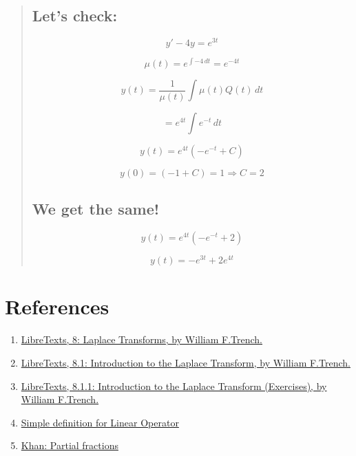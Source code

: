 \documentclass[
  letterpaper,
  DIV=11,
  numbers=noendperiod]{scrreprt}
\theoremstyle{plain}
\theoremstyle{remark}
\begin{document}
\begin{tcolorbox}
\begin{quote}
\subsection*{Let's check:}\label{lets-check}

\[y'-4y=e^{3t}\]

\[\mu(t)=e^{\int -4\,dt}=e^{-4t}\]

\[y(t)=\frac{1}{\mu(t)}\int \mu(t)Q(t)\,dt\]

\[=e^{4t}\int e^{-t}\,dt\]

\[y(t)=e^{4t}(-e^{-t}+C)\]

\[y(0)=(-1+C)=1\Rightarrow \boxed{C=2}\]

\subsection*{We get the same!}\label{we-get-the-same}

\[y(t)=e^{4t}(-e^{-t}+2)\]

\[\boxed{y(t)=-e^{3t}+2e^{4t}}\]
\end{quote}

\end{tcolorbox}

\section{References}\label{references-3}

\begin{enumerate}
\def\labelenumi{\arabic{enumi}.}
\setcounter{enumi}{-1}
\item
  \href{https://math.libretexts.org/Courses/Monroe_Community_College/MTH_225_Differential_Equations/8\%3A_Laplace_Transforms}{LibreTexts,
  8: Laplace Transforms, by William F.Trench.}
\item
  \href{https://math.libretexts.org/Courses/Monroe_Community_College/MTH_225_Differential_Equations/8\%3A_Laplace_Transforms/8.1\%3A_Introduction_to_the_Laplace_Transform}{LibreTexts,
  8.1: Introduction to the Laplace Transform, by William F.Trench.}
\item
  \href{https://math.libretexts.org/Courses/Monroe_Community_College/MTH_225_Differential_Equations/8\%3A_Laplace_Transforms/8.1\%3A_Introduction_to_the_Laplace_Transform/8.1.1\%3A_Introduction_to_the_Laplace_Transform_(Exercises)}{LibreTexts,
  8.1.1: Introduction to the Laplace Transform (Exercises), by William
  F.Trench.}
\item
  \href{https://undergroundmathematics.org/glossary/linear-operator}{Simple
  definition for Linear Operator}
\item
  \href{https://www.khanacademy.org/math/algebra-home/alg-rational-expr-eq-func/alg-partial-fraction/v/partial-fraction-expansion-1}{Khan:
  Partial fractions}
\end{enumerate}
\end{document}
